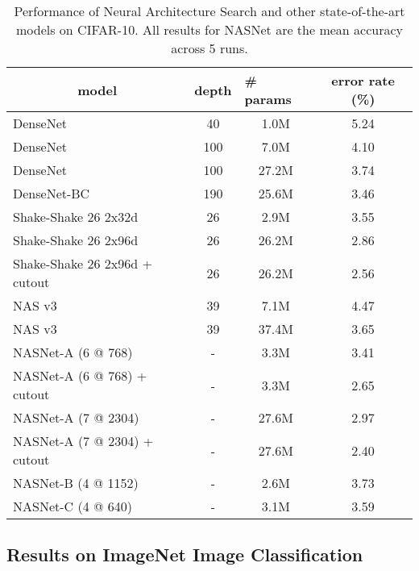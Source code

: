\begin{table*}[h!]
\centering
\small
\begin{tabular}{l|cc|c}
\toprule
\multicolumn{1}{c|}{\bf model} & \multicolumn{1}{l}{\bf depth} & \multicolumn{1}{l|}{\bf \# params}  & \bf error rate (\%)  \\ \midrule
DenseNet  \cite{Huang2016Densely} & 40 & 1.0M &  5.24  \\
DenseNet \cite{Huang2016Densely} & 100 & 7.0M &  4.10  \\
DenseNet  \cite{Huang2016Densely} & 100 & 27.2M &  3.74  \\ 
DenseNet-BC  \cite{Huang2016Densely} & 190 & 25.6M &  3.46  \\
\midrule
Shake-Shake 26 2x32d \cite{gastaldi17shakeshake} & 26 & 2.9M & 3.55 \\
Shake-Shake 26 2x96d \cite{gastaldi17shakeshake} & 26 & 26.2M & 2.86 \\
Shake-Shake 26 2x96d + cutout \cite{devries2017improved} & 26 & 26.2M & 2.56 \\
\midrule
NAS v3 \cite{zoph2017neural}& 39 & 7.1M & 4.47  \\
NAS v3 \cite{zoph2017neural}& 39 & 37.4M & 3.65 \\
\midrule
NASNet-A \;(6 @ 768) & - & 3.3M & 3.41 \\
NASNet-A \;(6 @ 768) + cutout & - & 3.3M & 2.65 \\
NASNet-A \;(7 @ 2304) & - & 27.6M & 2.97 \\
NASNet-A \;(7 @ 2304) + cutout & - & 27.6M & 2.40 \\
NASNet-B \;(4 @ 1152) & - & 2.6M & 3.73 \\
NASNet-C \;(4 @ 640) & - & 3.1M & 3.59 \\
\bottomrule
\end{tabular}
\vspace{0.2cm}
\caption{Performance of Neural Architecture Search and other state-of-the-art models on CIFAR-10. All results for NASNet are the mean accuracy across 5 runs.}
\label{tab:cifar10}
\end{table*}










\subsection{Results on ImageNet Image Classification}



